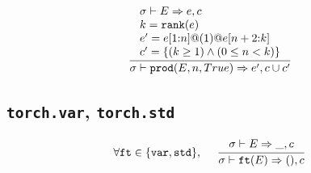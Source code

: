 \documentclass{article}
\begin{document}
\begin{align*}
  \frac
  {
    \begin{array}{l}
      \sigma \vdash E \Rightarrow e, c \\
      k = \mathtt{rank(}e\mathtt{)} \\
      e' = e \mathtt{[}1\mathtt{:}n\mathtt{]} \mathtt{@} (1) \mathtt{@} e \mathtt{[}n+2\mathtt{:}k\mathtt{]} \\
      c' = \{ (k \geq 1) \land (0 \leq n < k) \}
    \end{array}
  }
  {
    \sigma \vdash \mathtt{prod(}E, n, True\mathtt{)} \Rightarrow e', c \cup c'
  }
\end{align*}

\subsection*{\texttt{torch.var}, \texttt{torch.std}}
\begin{align*}
  \forall \mathtt{ft} \in \{\mathtt{var}, \mathtt{std}\},
  \,\,\,\,\,\,\,\,
  \frac
  {
    \begin{array}{l}
      \sigma \vdash E \Rightarrow \_, c
    \end{array}
  }
  {
    \sigma \vdash \mathtt{ft(}E\mathtt{)} \Rightarrow (), c
  }
\end{align*}
\end{document}
